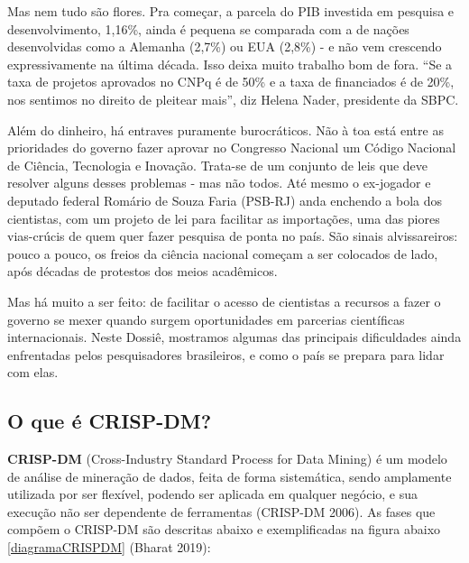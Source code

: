 \documentclass[]{article}
\begin{document}
Mas nem tudo são flores. Pra começar, a parcela do PIB investida em
pesquisa e desenvolvimento, 1,16\%, ainda é pequena se comparada com a
de nações desenvolvidas como a Alemanha (2,7\%) ou EUA (2,8\%) - e não
vem crescendo expressivamente na última década. Isso deixa muito
trabalho bom de fora. ``Se a taxa de projetos aprovados no CNPq é de
50\% e a taxa de financiados é de 20\%, nos sentimos no direito de
pleitear mais'', diz Helena Nader, presidente da SBPC.

Além do dinheiro, há entraves puramente burocráticos. Não à toa está
entre as prioridades do governo fazer aprovar no Congresso Nacional um
Código Nacional de Ciência, Tecnologia e Inovação. Trata-se de um
conjunto de leis que deve resolver alguns desses problemas - mas não
todos. Até mesmo o ex-jogador e deputado federal Romário de Souza Faria
(PSB-RJ) anda enchendo a bola dos cientistas, com um projeto de lei para
facilitar as importações, uma das piores vias-crúcis de quem quer fazer
pesquisa de ponta no país. São sinais alvissareiros: pouco a pouco, os
freios da ciência nacional começam a ser colocados de lado, após décadas
de protestos dos meios acadêmicos.

Mas há muito a ser feito: de facilitar o acesso de cientistas a recursos
a fazer o governo se mexer quando surgem oportunidades em parcerias
científicas internacionais. Neste Dossiê, mostramos algumas das
principais dificuldades ainda enfrentadas pelos pesquisadores
brasileiros, e como o país se prepara para lidar com elas.

\hypertarget{o-que-uxe9-crisp-dm}{%
\subsection{O que é CRISP-DM?}\label{o-que-uxe9-crisp-dm}}

\textbf{CRISP-DM} (Cross-Industry Standard Process for Data Mining) é um
modelo de análise de mineração de dados, feita de forma sistemática,
sendo amplamente utilizada por ser flexível, podendo ser aplicada em
qualquer negócio, e sua execução não ser dependente de ferramentas
(CRISP-DM 2006). As fases que compõem o CRISP-DM são descritas abaixo e
exemplificadas na figura abaixo \ref{diagramaCRISPDM} (Bharat 2019):
\end{document}
